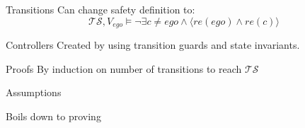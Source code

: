 \documentclass[xcolor=table]{beamer}
\begin{document}
\begin{frame}{Transitions}
Can change safety definition to:
\begin{equation*}\label{eq:safety_goal}
\mathcal{TS}, V_{ego} \models \neg \exists c \neq ego \land \langle re(ego) \land re(c)\rangle
\end{equation*}

\end{frame}

\begin{frame}{Controllers}
Created by using transition guards and state invariants.
\end{frame}

\begin{frame}{Proofs}
By induction on number of transitions to reach $\mathcal{TS}$

Assumptions

Boils down to proving
\end{frame}
\end{document}
